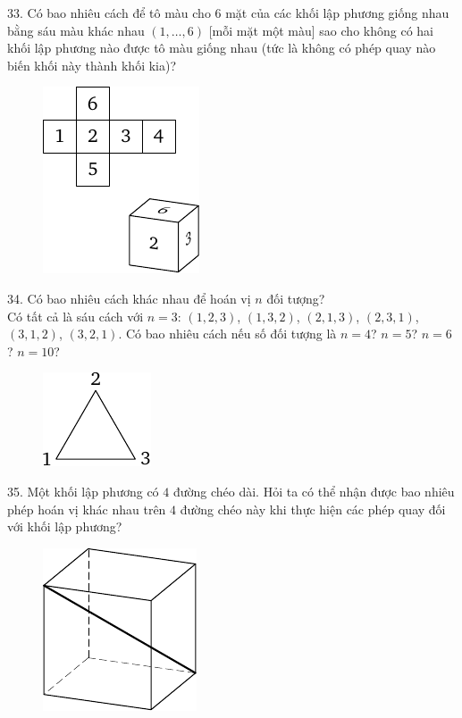 \begin{problem}{33.}
	Có bao nhiêu cách để tô màu cho 6 mặt của các khối lập phương giống nhau bằng sáu màu khác nhau $(1,\dotsc,6)$ [mỗi mặt một màu] sao cho không có hai khối lập phương nào được tô màu giống nhau (tức là không có phép quay nào biến khối này thành khối kia)?
	\begin{figure}
		\includegraphics{resources/taskbook-17}
	\end{figure}
\end{problem}

\begin{problem}{34.}
	Có bao nhiêu cách khác nhau để hoán vị $n$ đối tượng?\\
	Có tất cả là sáu cách với $n=3$: $(1,2,3)$, $(1,3,2)$, $(2,1,3)$, $(2,3,1)$, $(3,1,2)$, $(3,2,1)$. Có bao nhiêu cách nếu số đối tượng là $n=4$? $n=5$? $n=6$? $n=10$?
	\begin{figure}
		\includegraphics{resources/taskbook-18}
	\end{figure}
\end{problem}

\begin{problem}{35.}
	Một khối lập phương có $4$ đường chéo dài. Hỏi ta có thể nhận được bao nhiêu phép hoán vị khác nhau trên $4$ đường chéo này khi thực hiện các phép quay đối với khối lập phương?
	\begin{figure}
		\includegraphics{resources/taskbook-19}
	\end{figure}
\end{problem}

